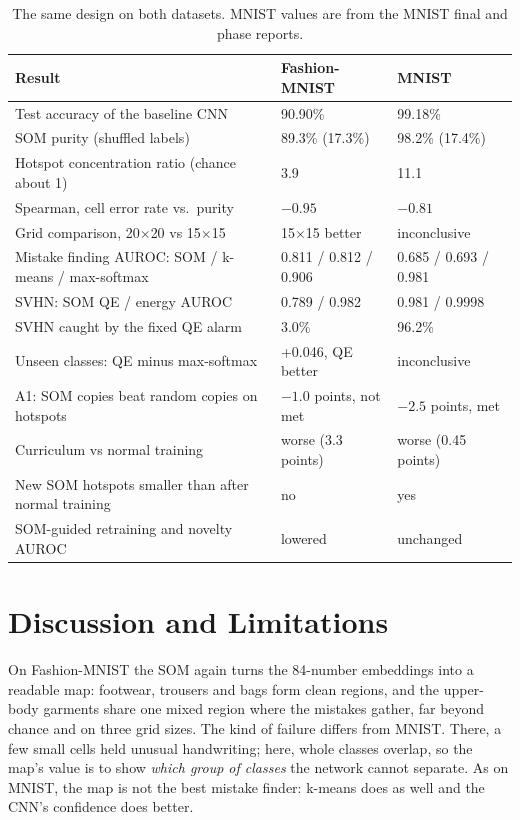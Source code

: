 \documentclass[11pt]{article}
\begin{document}
\begin{table}[H]
\centering
\renewcommand{\arraystretch}{1.12}
\footnotesize
\begin{tabular}{|>{\raggedright\arraybackslash}p{}|C{0.22\textwidth}|C{0.22\textwidth}|}
\hline
\textbf{Result} & \textbf{Fashion-MNIST} & \textbf{MNIST} \\ \hline
Test accuracy of the baseline CNN & 90.90\% & 99.18\% \\ \hline
SOM purity (shuffled labels) & 89.3\% (17.3\%) & 98.2\% (17.4\%) \\ \hline
Hotspot concentration ratio (chance about 1) & 3.9 & 11.1 \\ \hline
Spearman, cell error rate vs.\ purity & $-0.95$ & $-0.81$ \\ \hline
Grid comparison, 20$\times$20 vs 15$\times$15 & 15$\times$15 better & inconclusive \\ \hline
Mistake finding AUROC: SOM / k-means / max-softmax & 0.811 / 0.812 / 0.906 & 0.685 / 0.693 / 0.981 \\ \hline
SVHN: SOM QE / energy AUROC & 0.789 / 0.982 & 0.981 / 0.9998 \\ \hline
SVHN caught by the fixed QE alarm & 3.0\% & 96.2\% \\ \hline
Unseen classes: QE minus max-softmax & +0.046, QE better & inconclusive \\ \hline
A1: SOM copies beat random copies on hotspots & $-1.0$ points, not met & $-2.5$ points, met \\ \hline
Curriculum vs normal training & worse (3.3 points) & worse (0.45 points) \\ \hline
New SOM hotspots smaller than after normal training & no & yes \\ \hline
SOM-guided retraining and novelty AUROC & lowered & unchanged \\ \hline
\end{tabular}
\caption{The same design on both datasets. MNIST values are from the MNIST final and phase reports.}
\label{tab:mnist}
\end{table}

\section{Discussion and Limitations}

On Fashion-MNIST the SOM again turns the 84-number embeddings into a readable map: footwear, trousers and bags form clean regions, and the upper-body garments share one mixed region where the mistakes gather, far beyond chance and on three grid sizes. The kind of failure differs from MNIST. There, a few small cells held unusual handwriting; here, whole classes overlap, so the map's value is to show \emph{which group of classes} the network cannot separate.
As on MNIST, the map is not the best mistake finder: k-means does as well and the CNN's confidence does better.
\end{document}
